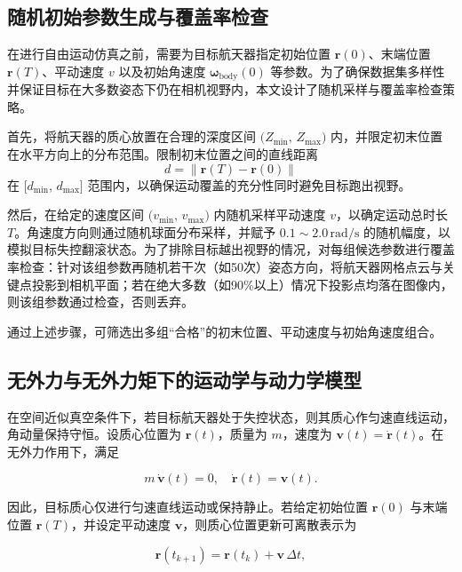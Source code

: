 \subsection{随机初始参数生成与覆盖率检查}
在进行自由运动仿真之前，需要为目标航天器指定初始位置 \(\mathbf{r}(0)\)、末端位置 \(\mathbf{r}(T)\)、平动速度 \(v\) 以及初始角速度 \(\boldsymbol{\omega}_{\mathrm{body}}(0)\) 等参数。为了确保数据集多样性并保证目标在大多数姿态下仍在相机视野内，本文设计了随机采样与覆盖率检查策略。

首先，将航天器的质心放置在合理的深度区间 \(\bigl(Z_{\min},\,Z_{\max}\bigr)\) 内，并限定初末位置在水平方向上的分布范围。限制初末位置之间的直线距离
\begin{equation}
d = \|\mathbf{r}(T) - \mathbf{r}(0)\|
\end{equation}
在 \(\bigl[d_{\min},\,d_{\max}\bigr]\) 范围内，以确保运动覆盖的充分性同时避免目标跑出视野。

然后，在给定的速度区间 \(\bigl(v_{\min},\,v_{\max}\bigr)\) 内随机采样平动速度 \(v\)，以确定运动总时长 \(T\)。角速度方向则通过随机球面分布采样，并赋予 \(0.1 \sim 2.0\,\mathrm{rad/s}\) 的随机幅度，以模拟目标失控翻滚状态。为了排除目标越出视野的情况，对每组候选参数进行覆盖率检查：针对该组参数再随机若干次（如50次）姿态方向，将航天器网格点云与关键点投影到相机平面；若在绝大多数（如90\%以上）情况下投影点均落在图像内，则该组参数通过检查，否则丢弃。

通过上述步骤，可筛选出多组“合格”的初末位置、平动速度与初始角速度组合。


\subsection{无外力与无外力矩下的运动学与动力学模型}

在空间近似真空条件下，若目标航天器处于失控状态，则其质心作匀速直线运动，角动量保持守恒。设质心位置为 \(\mathbf{r}(t)\)，质量为 \(m\)，速度为 \(\mathbf{v}(t) = \dot{\mathbf{r}}(t)\)。在无外力作用下，满足

\begin{equation}
	m \,\dot{\mathbf{v}}(t) = 0, 
	\quad 
	\dot{\mathbf{r}}(t) = \mathbf{v}(t).
\end{equation}

因此，目标质心仅进行匀速直线运动或保持静止。若给定初始位置 \(\mathbf{r}(0)\) 与末端位置 \(\mathbf{r}(T)\)，并设定平动速度 \(\mathbf{v}\)，则质心位置更新可离散表示为

\begin{equation}
	\mathbf{r}(t_{k+1}) = \mathbf{r}(t_k) + \mathbf{v}\,\Delta t,
\end{equation}

